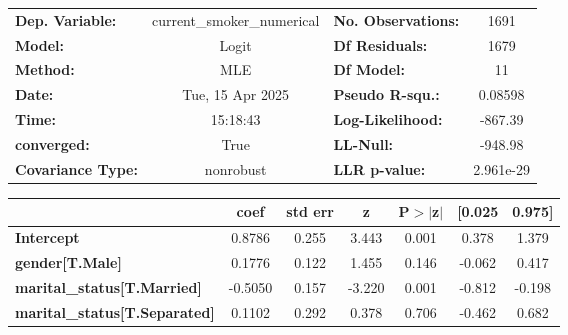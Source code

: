 \begin{center}
\begin{tabular}{lclc}
\toprule
\textbf{Dep. Variable:}                                           & current\_smoker\_numerical & \textbf{  No. Observations:  } &     1691    \\
\textbf{Model:}                                                   &           Logit            & \textbf{  Df Residuals:      } &     1679    \\
\textbf{Method:}                                                  &            MLE             & \textbf{  Df Model:          } &       11    \\
\textbf{Date:}                                                    &      Tue, 15 Apr 2025      & \textbf{  Pseudo R-squ.:     } &  0.08598    \\
\textbf{Time:}                                                    &          15:18:43          & \textbf{  Log-Likelihood:    } &   -867.39   \\
\textbf{converged:}                                               &            True            & \textbf{  LL-Null:           } &   -948.98   \\
\textbf{Covariance Type:}                                         &         nonrobust          & \textbf{  LLR p-value:       } & 2.961e-29   \\
\bottomrule
\end{tabular}
\begin{tabular}{lcccccc}
                                                                  & \textbf{coef} & \textbf{std err} & \textbf{z} & \textbf{P$> |$z$|$} & \textbf{[0.025} & \textbf{0.975]}  \\
\midrule
\textbf{Intercept}                                                &       0.8786  &        0.255     &     3.443  &         0.001        &        0.378    &        1.379     \\
\textbf{gender[T.Male]}                                           &       0.1776  &        0.122     &     1.455  &         0.146        &       -0.062    &        0.417     \\
\textbf{marital\_status[T.Married]}                               &      -0.5050  &        0.157     &    -3.220  &         0.001        &       -0.812    &       -0.198     \\
\textbf{marital\_status[T.Separated]}                             &       0.1102  &        0.292     &     0.378  &         0.706        &       -0.462    &        0.682     \\

\end{tabular}
\end{center}
